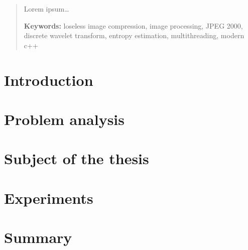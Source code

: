 \documentclass[12pt, twoside, a4paper, openright]{report}
\begin{document}


\cleardoublepage

 
\cleardoublepage



\cleardoublepage


\begin{abstract}
    Lorem ipsum\dots

    \textbf{Keywords:} loseless image compression, image processing, JPEG 2000,
    discrete wavelet transform, entropy estimation, multithreading, modern c++
\end{abstract}

\tableofcontents

\newpage
{}

\chapter{Introduction} \label{ch:intro}


\chapter{Problem analysis} \label{ch:problem}


\chapter{Subject of the thesis} \label{ch:subject}


\chapter{Experiments} \label{ch:experiments}


\chapter{Summary} \label{ch:summary}


\begin{appendices}
    
\end{appendices}

\newpage

\listoffigures
\listoftables

\nocite{*}


\end{document}
